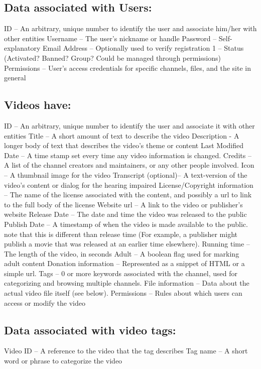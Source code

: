 \documentclass[a4paper,12pt]{report}
\begin{document}
\subsection{Data associated with Users:}
	ID – An arbitrary, unique number to identify the user and associate him/her with 		other entities
	Username – The user's nickname or handle
	Password – Self-explanatory
	Email Address – Optionally used to verify registration
	1 – Status (Activated? Banned? Group? Could be managed through permissions)
	Permissions – User's access credentials for specific channels, files, and the site in 	general

\subsection{Videos have:}
	ID – An arbitrary, unique number to identify the user and associate it with other 		entities 
	Title – A short amount of text to describe the video
Description - A longer body of text that describes the video's theme or content
	Last Modified Date – A time stamp set every time any video information is 		changed.
	Credits – A list of the channel creators and maintainers, or any other people 		involved. 
	Icon – A thumbnail image for the video
	Transcript (optional)– A text-version of the video's content or dialog for the 		hearing impaired
	License/Copyright information – The name of the license associated with the 	content, and possibly a url to link to the full body of the license
	Website url – A link to the video  or publisher's website
	Release Date – The date and time the video was released to the public
Publish Date – A timestamp of when the video is made available to the public. 		note that this is different than release time (For example, a publisher might 		publish a movie that was released at an earlier time elsewhere).
	Running time – The length of the video, in seconds
	Adult – A boolean flag used for marking adult content
	Donation information – Represented as a snippet of HTML or a simple url.
Tags – 0 or more keywords associated with the channel, used for categorizing and 	browsing multiple channels.
File information – Data about the actual video file itself (see below).
	Permissions – Rules about which users can access or modify the video

\subsection{Data associated with video tags:}
	Video ID – A reference to the video that the tag describes
	Tag name – A short word or phrase to categorize the video
\end{document}
